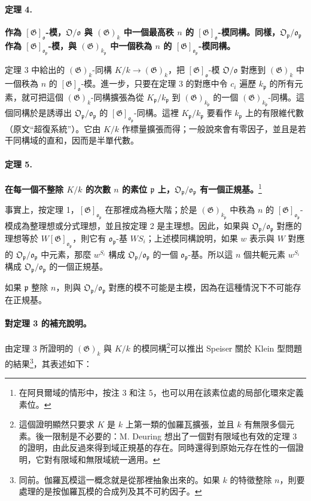 \documentclass[11pt]{article}
\newcommand{\frakO}{\mathfrak O}
\newcommand{\frako}{\mathfrak o}
\newcommand{\frakp}{\mathfrak p}
\newcommand{\Gg}{\mathfrak G}
\newcommand{\srcemph}[1]{\textbf{#1}}
\begin{document}
\paragraph{定理 4.}
\srcemph{作為 \([\Gg]_\frako\)-模，\(\frakO/\frako\) 與 \((\Gg)_k\) 中一個最高秩 \(n\) 的 \([\Gg]_\frako\)-模同構。同樣，\(\frakO_\frakp/\frako_\frakp\) 作為 \([\Gg]_{\frako_\frakp}\)-模，與 \((\Gg)_{k_\frakp}\) 中一個秩為 \(n\) 的 \([\Gg]_{\frako_\frakp}\)-模同構。}

定理 3 中給出的 \((\Gg)_k\)-同構 \(K/k\to(\Gg)_k\)，把 \([\Gg]_\frako\)-模 \(\frakO/\frako\) 對應到 \((\Gg)_k\) 中一個秩為 \(n\) 的 \([\Gg]_\frako\)-模。進一步，只要在定理 3 的對應中令 \(c_i\) 遍歷 \(k_\frakp\) 的所有元素，就可把這個 \((\Gg)_k\)-同構擴張為從 \(K_\frakp/k_\frakp\) 到 \((\Gg)_{k_\frakp}\) 的一個 \((\Gg)_{k_\frakp}\)-同構。這個同構於是誘導出 \(\frakO_\frakp/\frako_\frakp\) 的 \([\Gg]_{\frako_\frakp}\)-同構。這裡 \(K_\frakp/k_\frakp\) 要看作 \(k_\frakp\) 上的有限維代數（原文“超復系統”）。它由 \(K/k\) 作標量擴張而得；一般說來會有零因子，並且是若干同構域的直和，因而是半單代數。

\paragraph{定理 5.}
\srcemph{在每一個不整除 \(K/k\) 的次數 \(n\) 的素位 \(\frakp\) 上，\(\frakO_\frakp/\frako_\frakp\) 有一個正規基。}\footnote{在阿貝爾域的情形中，按注 3 和注 5，也可以用在該素位處的局部化環來定義素位。}

事實上，按定理 1，\([\Gg]_{\frako_\frakp}\) 在那裡成為極大階；於是 \((\Gg)_{k_\frakp}\) 中秩為 \(n\) 的 \([\Gg]_{\frako_\frakp}\)-模成為整理想或分式理想，並且按定理 2 是主理想。因此，如果與 \(\frakO_\frakp/\frako_\frakp\) 對應的理想等於 \(W[\Gg]_{\frako_\frakp}\)，則它有 \(\frako_\frakp\)-基 \(WS_i\)；上述模同構說明，如果 \(w\) 表示與 \(W\) 對應的 \(\frakO_\frakp/\frako_\frakp\) 中元素，那麼 \(w^{S_i}\) 構成 \(\frakO_\frakp/\frako_\frakp\) 的一個 \(\frako_\frakp\)-基。所以這 \(n\) 個共軛元素 \(w^{S_i}\) 構成 \(\frakO_\frakp/\frako_\frakp\) 的一個正規基。

如果 \(\frakp\) 整除 \(n\)，則與 \(\frakO_\frakp/\frako_\frakp\) 對應的模不可能是主模，因為在這種情況下不可能存在正規基。

\paragraph{對定理 3 的補充說明。}
由定理 3 所證明的 \((\Gg)_k\) 與 \(K/k\) 的模同構\footnote{這個證明顯然只要求 \(K\) 是 \(k\) 上第一類的伽羅瓦擴張，並且 \(k\) 有無限多個元素。後一限制是不必要的：M. Deuring 想出了一個對有限域也有效的定理 3 的證明，由此反過來得到域正規基的存在。同時還得到原始元存在性的一個證明，它對有限域和無限域統一適用。}可以推出 Speiser 關於 Klein 型問題的結果\footnote{同前。伽羅瓦模這一概念就是從那裡抽象出來的。如果 \(k\) 的特徵整除 \(n\)，則要處理的是按伽羅瓦模的合成列及其不可約因子。}，其表述如下：
\end{document}
